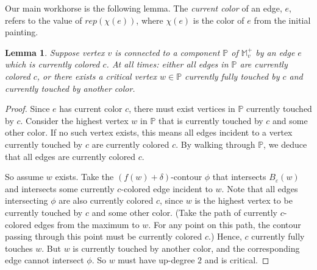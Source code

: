 \documentclass[11pt]{article}
\newcommand{\ignore}[1]{}
\newtheorem{claim}[theorem]{Claim}
\newtheorem{lemma}[theorem]{Lemma}
\theoremstyle{definition}
\newcommand{\cC}{{\cal C}}
\newcommand{\cJ}{{\cal J}}
\newcommand{\MM}{\mathbb{M}}
\newcommand{\PP}{\mathbb{P}}
\newcommand{\eps}{\varepsilon}
\newcommand{\Thm}[1]{\hyperref[thm:#1]{Theorem~\ref*{thm:#1}}} %
\newcommand{\h}{att}
\newcommand{\pal}{P}
\newcommand{\rep}{rep}
\begin{document}
\ignore{
\begin{claim} \label{clm:process} Assume the invariant. Any vertex with a non-increasing path to some $\h(c)$
for $c \in \pal$ has been processed.
\end{claim}

\begin{proof} This is a direct consequence of \Thm{carr-mono}, which relates monotone paths in $\MM$ to $\cC(\MM)$.
Since the subtree of $\cJ(\MM)$ (which is basically the subtree of $\cC(\MM)$) rooted at $\h(c)$ 
has been found, all vertices in this subtree must be processed. These are all the vertices with non-increasing paths
to $\h(c)$ in $\cC(\MM)$, which by \Thm{carr-mono} is the same as those in $\cC(\MM)$.
\end{proof}
}

Our main workhorse is the following lemma. The \emph{current color} of an edge, $e$, refers to the value of $\rep(\chi(e))$, 
where $\chi(e)$ is the color of $e$ from the initial painting.

\begin{lemma} \label{lem:full} Suppose vertex $v$ is connected to a component $\PP$ of $\MM^+_v$
by an edge $e$ which is currently colored $c$. At all times: either all edges in $\PP$ are currently colored $c$, or there
exists a critical vertex $w \in \PP$ currently fully touched by $c$ and currently touched by another color.
\end{lemma}

\begin{proof} Since $e$ has current color $c$,
there must exist vertices in $\PP$ currently touched by $c$. Consider the highest
vertex $w$ in $\PP$ that is currently touched by $c$ and some other color. If no such vertex exists,
this means all edges incident to a vertex currently touched by $c$ are currently colored $c$. By walking through
$\PP$, we deduce that all edges are currently colored $c$. 

So assume $w$ exists. Take the $(f(w)+\delta)$-contour $\phi$ that intersects $B_\eps(w)$
and intersects some currently $c$-colored edge incident to $w$. Note that all edges intersecting $\phi$ are also currently colored $c$,
since $w$ is the highest vertex to be currently touched by $c$ and some other color. (Take the path of currently $c$-colored
edges from the maximum to $w$. For any point on this path, the contour passing through this point must
be currently colored $c$.) Hence, $c$ currently fully touches $w$. 
But $w$ is currently touched by another color, and the corresponding edge cannot intersect $\phi$. So $w$
must have up-degree $2$ and is critical.
\end{proof}
\end{document}
